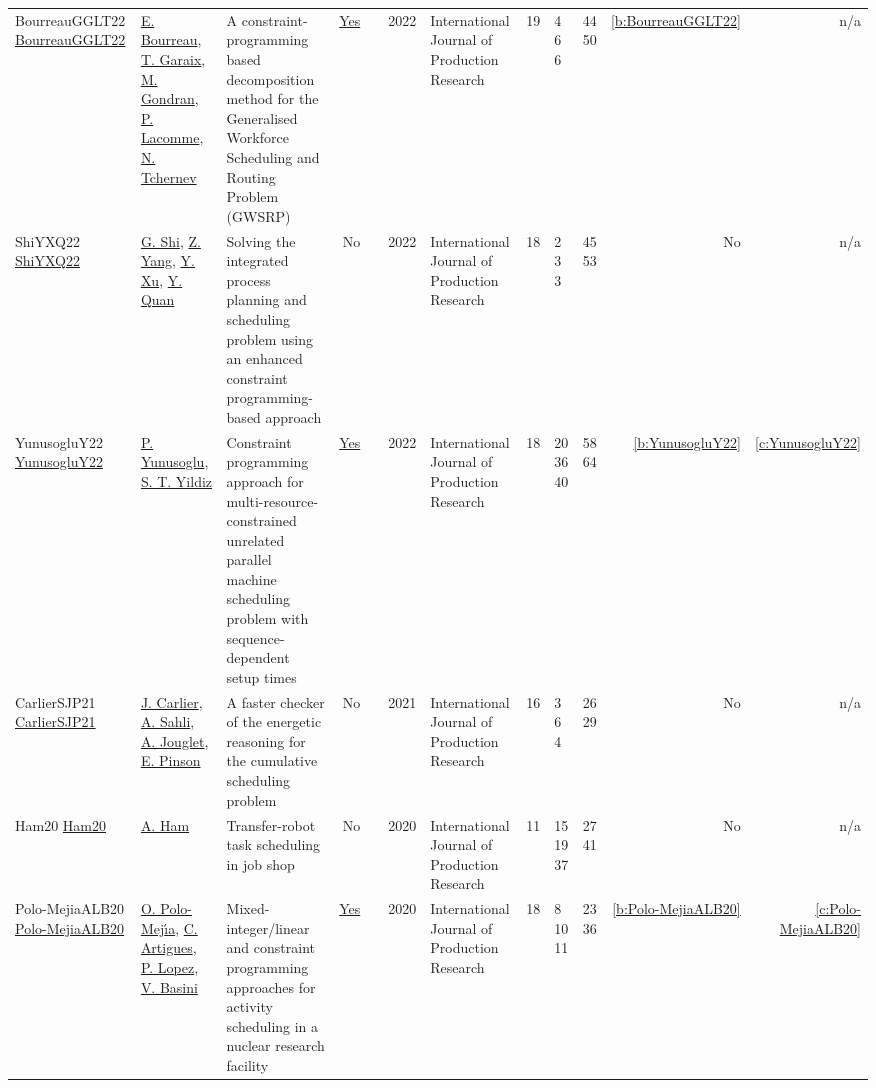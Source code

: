 {\begin{longtable}{>{\raggedright\arraybackslash}p{3cm}>{\raggedright\arraybackslash}p{4.5cm}>{\raggedright\arraybackslash}p{6.0cm}rrrp{2.5cm}rp{1cm}p{1cm}rr}
BourreauGGLT22 \href{https://doi.org/10.1080/00207543.2020.1856436}{BourreauGGLT22} & \hyperref[auth:a441]{E. Bourreau}, \hyperref[auth:a442]{T. Garaix}, \hyperref[auth:a443]{M. Gondran}, \hyperref[auth:a444]{P. Lacomme}, \hyperref[auth:a445]{N. Tchernev} & \cellcolor{green!10}A constraint-programming based decomposition method for the Generalised Workforce Scheduling and Routing Problem {(GWSRP)} & \href{../works/BourreauGGLT22.pdf}{Yes} & \cite{BourreauGGLT22} & 2022 & \cellcolor{red!20}International Journal of Production Research & 19 & 4 6 6 & 44 50 & \ref{b:BourreauGGLT22} & n/a\\
ShiYXQ22 \href{https://doi.org/10.1080/00207543.2021.1963496}{ShiYXQ22} & \hyperref[auth:a446]{G. Shi}, \hyperref[auth:a447]{Z. Yang}, \hyperref[auth:a448]{Y. Xu}, \hyperref[auth:a449]{Y. Quan} & Solving the integrated process planning and scheduling problem using an enhanced constraint programming-based approach & No & \cite{ShiYXQ22} & 2022 & \cellcolor{red!20}International Journal of Production Research & 18 & 2 3 3 & 45 53 & No & n/a\\
YunusogluY22 \href{https://doi.org/10.1080/00207543.2021.1885068}{YunusogluY22} & \hyperref[auth:a450]{P. Yunusoglu}, \hyperref[auth:a421]{S. T. Yildiz} & Constraint programming approach for multi-resource-constrained unrelated parallel machine scheduling problem with sequence-dependent setup times & \href{../works/YunusogluY22.pdf}{Yes} & \cite{YunusogluY22} & 2022 & \cellcolor{red!20}International Journal of Production Research & 18 & 20 36 40 & 58 64 & \ref{b:YunusogluY22} & \ref{c:YunusogluY22}\\
CarlierSJP21 \href{http://dx.doi.org/10.1080/00207543.2021.1923853}{CarlierSJP21} & \hyperref[auth:a845]{J. Carlier}, \hyperref[auth:a928]{A. Sahli}, \hyperref[auth:a929]{A. Jouglet}, \hyperref[auth:a846]{E. Pinson} & A faster checker of the energetic reasoning for the cumulative scheduling problem & No & \cite{CarlierSJP21} & 2021 & \cellcolor{red!20}International Journal of Production Research & 16 & 3 6 4 & 26 29 & No & n/a\\
Ham20 \href{http://dx.doi.org/10.1080/00207543.2019.1709671}{Ham20} & \hyperref[auth:a750]{A. Ham} & Transfer-robot task scheduling in job shop & No & \cite{Ham20} & 2020 & \cellcolor{red!20}International Journal of Production Research & 11 & 15 19 37 & 27 41 & No & n/a\\
Polo-MejiaALB20 \href{https://doi.org/10.1080/00207543.2019.1693654}{Polo-MejiaALB20} & \hyperref[auth:a517]{O. Polo-Mej{\'{\i}}a}, \hyperref[auth:a6]{C. Artigues}, \hyperref[auth:a3]{P. Lopez}, \hyperref[auth:a518]{V. Basini} & \cellcolor{green!10}Mixed-integer/linear and constraint programming approaches for activity scheduling in a nuclear research facility & \href{../works/Polo-MejiaALB20.pdf}{Yes} & \cite{Polo-MejiaALB20} & 2020 & \cellcolor{red!20}International Journal of Production Research & 18 & 8 10 11 & 23 36 & \ref{b:Polo-MejiaALB20} & \ref{c:Polo-MejiaALB20}\\

\end{longtable}}
